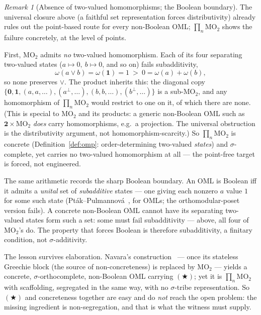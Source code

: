 \documentclass[11pt,reqno]{amsart}
\theoremstyle{plain}
\theoremstyle{definition}
\theoremstyle{remark}
\newtheorem{remark}[theorem]{Remark}
\begin{document}
\begin{remark}[Absence of two-valued homomorphisms; the Boolean boundary]\label{rem:inhabited}
The universal closure above (a faithful set representation forces distributivity)
already rules out the point-based route for every non-Boolean OML; $\prod_n\mathrm{MO}_2$
shows the failure concretely, at the level of points.

First, $\mathrm{MO}_2$ admits \emph{no} two-valued homomorphism. Each of its four
separating two-valued states ($a\mapsto0,\ b\mapsto0$, and so on) fails subadditivity,
\[
  \omega(a\vee b)=\omega(\mathbf 1)=1 \ >\ 0=\omega(a)+\omega(b),
\]
so none preserves $\vee$. The product inherits this: the diagonal copy
$\{\mathbf 0,\mathbf 1,(a,a,\dots),(a^\perp,\dots),(b,b,\dots),(b^\perp,\dots)\}$ is a
sub-$\mathrm{MO}_2$, and any homomorphism of $\prod_n\mathrm{MO}_2$ would restrict to one
on it, of which there are none. (This is special to $\mathrm{MO}_2$ and its products: a
generic non-Boolean OML such as $\mathbf 2\times\mathrm{MO}_2$ \emph{does} carry
homomorphisms, e.g.\ a projection. The universal obstruction is the distributivity
argument, not homomorphism-scarcity.) So $\prod_n\mathrm{MO}_2$ is concrete
(Definition~\ref{def:omp}: order-determining two-valued \emph{states}) and
$\sigma$-complete, yet carries no two-valued homomorphism at all --- the point-free
target is forced, not engineered.

The same arithmetic records the sharp Boolean boundary. An OML is Boolean iff it admits a
\emph{unital} set of \emph{subadditive} states --- one giving each nonzero $a$ value $1$
for some such state (Pt\'ak--Pulmannov\'a~\cite[Thm~1]{PtakPulmannova1994}, for OMLs; the
orthomodular-poset version fails). A concrete non-Boolean OML cannot have its separating
two-valued states form such a set: some must fail subadditivity --- above, all four of
$\mathrm{MO}_2$'s do. The property that forces Boolean is therefore subadditivity, a
finitary condition, not $\sigma$-additivity.
\end{remark}

\noindent The lesson survives elaboration. Navara's
construction~\cite{Navara1992} --- once its stateless Greechie block (the source of
non-concreteness) is replaced by $\mathrm{MO}_2$ --- yields a concrete,
$\sigma$-orthocomplete, non-Boolean OML carrying $(\bigstar)$; yet it is
$\prod_n\mathrm{MO}_2$ with scaffolding, segregated in the same way, with no
$\sigma$-tribe representation. So $(\bigstar)$ and concreteness together are easy and
do \emph{not} reach the open problem: the missing ingredient is non-segregation, and
that is what the witness must supply.
\end{document}
